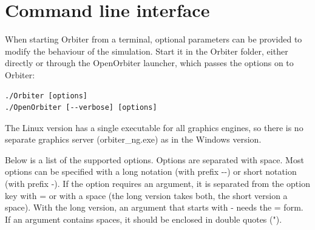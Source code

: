 \documentclass[Orbiter User Manual.tex]{subfiles}
\begin{document}
\section{Command line interface}
When starting Orbiter from a terminal, optional parameters can be provided to modify the behaviour of the simulation. Start it in the Orbiter folder, either directly or through the OpenOrbiter launcher, which passes the options on to Orbiter:

\begin{lstlisting}[language=OSFS]
./Orbiter [options]
./OpenOrbiter [--verbose] [options]
\end{lstlisting}

\noindent
The Linux version has a single executable for all graphics engines, so there is no separate graphics server (orbiter\_ng.exe) as in the Windows version.

\noindent
Below is a list of the supported options. Options are separated with space. Most options can be specified with a long notation (with prefix -{}-) or short notation (with prefix -). If the option requires an argument, it is separated from the option key with = or with a space (the long version takes both, the short version a space). With the long version, an argument that starts with - needs the = form. If an argument contains spaces, it should be enclosed in double quotes (").
\end{document}
